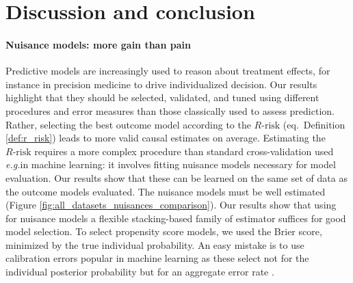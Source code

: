 \documentclass[a4paper,num-refs]{oup-contemporary}%
\newcommand{\eg}{\emph{e.g.}}
\begin{document}
\section{Discussion and conclusion}\label{sec:discussion}\label{sec:conclusion}


\paragraph{Nuisance models: more gain than pain}
%
Predictive models are increasingly used to reason about treatment effects, for
instance in precision medicine to drive individualized decision. Our results
highlight that they should be selected, validated, and tuned using different
procedures and error measures than those classically used to assess prediction. Rather, selecting the best outcome
model according to the $R\text{-risk}$ (eq.\, Definition \ref{def:r_risk}) leads
to more valid causal estimates on average. Estimating the $R\text{-risk}$ requires a more
complex procedure than standard cross-validation used \eg in machine
learning: it involves fitting nuisance models necessary for model
evaluation.
Our results show that these can be learned on the same set of data as the
outcome models evaluated. The nuisance models must be well estimated (Figure
\ref{fig:all_datasets_nuisances_comparison}). Our results show that using for
nuisance models a flexible stacking-based family of estimator suffices for good
model selection. To select propensity score models, we used the Brier score,
minimized by the true individual probability. An easy mistake is to
use calibration errors popular in machine learning
\cite{platt_probabilistic_1999,zadrozny_obtaining_2001,niculescu-mizil_predicting_2005,minderer_revisiting_2021}
as these select not for the individual posterior probability but for an
aggregate error rate \cite{perez2022beyond}.

%
\end{document}
